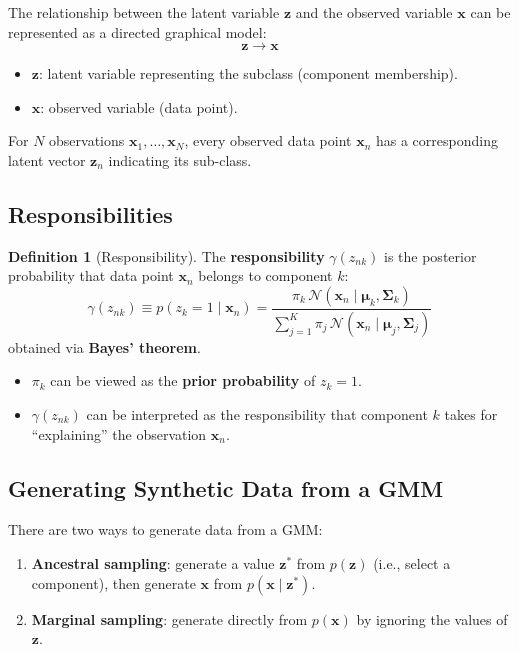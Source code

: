 \documentclass[11pt,a4paper]{article}
\theoremstyle{definition}
\newtheorem{definition}{Definition}[section]
\theoremstyle{plain}
\theoremstyle{remark}
\begin{document}
\begin{tcolorbox}[colback=purple!5!white,colframe=purple!75!black,title=\textbf{Graphical Model for GMM}]
The relationship between the latent variable $\mathbf{z}$ and the observed variable $\mathbf{x}$ can be represented as a directed graphical model:
\[
\mathbf{z} \longrightarrow \mathbf{x}
\]
\begin{itemize}
    \item $\mathbf{z}$: latent variable representing the subclass (component membership).
    \item $\mathbf{x}$: observed variable (data point).
\end{itemize}
For $N$ observations $\mathbf{x}_1, \dots, \mathbf{x}_N$, every observed data point $\mathbf{x}_n$ has a corresponding latent vector $\mathbf{z}_n$ indicating its sub-class.
\end{tcolorbox}

\subsection{Responsibilities}

\begin{definition}[Responsibility]
The \textbf{responsibility} $\gamma(z_{nk})$ is the posterior probability that data point $\mathbf{x}_n$ belongs to component $k$:
\[
\gamma(z_{nk}) \equiv p(z_k = 1 \mid \mathbf{x}_n) = \frac{\pi_k \, \mathcal{N}(\mathbf{x}_n \mid \boldsymbol{\mu}_k, \boldsymbol{\Sigma}_k)}{\displaystyle\sum_{j=1}^{K} \pi_j \, \mathcal{N}(\mathbf{x}_n \mid \boldsymbol{\mu}_j, \boldsymbol{\Sigma}_j)}
\]
obtained via \textbf{Bayes' theorem}.
\end{definition}

\begin{itemize}
    \item $\pi_k$ can be viewed as the \textbf{prior probability} of $z_k = 1$.
    \item $\gamma(z_{nk})$ can be interpreted as the responsibility that component $k$ takes for ``explaining'' the observation $\mathbf{x}_n$.
\end{itemize}

\subsection{Generating Synthetic Data from a GMM}

There are two ways to generate data from a GMM:
\begin{enumerate}
    \item \textbf{Ancestral sampling}: generate a value $\mathbf{z}^*$ from $p(\mathbf{z})$ (i.e., select a component), then generate $\mathbf{x}$ from $p(\mathbf{x} \mid \mathbf{z}^*)$.
    \item \textbf{Marginal sampling}: generate directly from $p(\mathbf{x})$ by ignoring the values of $\mathbf{z}$.
\end{enumerate}
\end{document}
